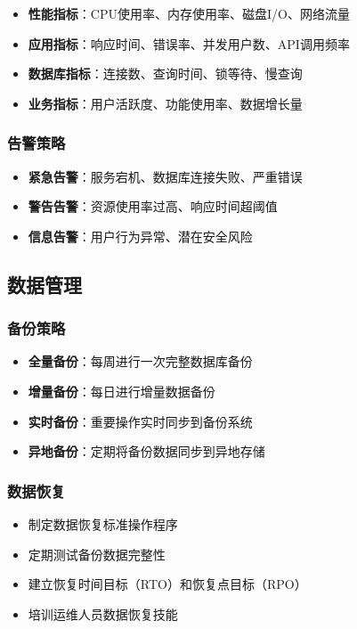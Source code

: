 \documentclass[a4paper]{article}
\begin{document}
\begin{itemize}
    \item \textbf{性能指标}：CPU使用率、内存使用率、磁盘I/O、网络流量
    \item \textbf{应用指标}：响应时间、错误率、并发用户数、API调用频率
    \item \textbf{数据库指标}：连接数、查询时间、锁等待、慢查询
    \item \textbf{业务指标}：用户活跃度、功能使用率、数据增长量
\end{itemize}

\subsubsection{告警策略}

\begin{itemize}
    \item \textbf{紧急告警}：服务宕机、数据库连接失败、严重错误
    \item \textbf{警告告警}：资源使用率过高、响应时间超阈值
    \item \textbf{信息告警}：用户行为异常、潜在安全风险
\end{itemize}

\subsection{数据管理}

\subsubsection{备份策略}

\begin{itemize}
    \item \textbf{全量备份}：每周进行一次完整数据库备份
    \item \textbf{增量备份}：每日进行增量数据备份
    \item \textbf{实时备份}：重要操作实时同步到备份系统
    \item \textbf{异地备份}：定期将备份数据同步到异地存储
\end{itemize}

\subsubsection{数据恢复}

\begin{itemize}
    \item 制定数据恢复标准操作程序
    \item 定期测试备份数据完整性
    \item 建立恢复时间目标（RTO）和恢复点目标（RPO）
    \item 培训运维人员数据恢复技能
\end{itemize}
\end{document}
